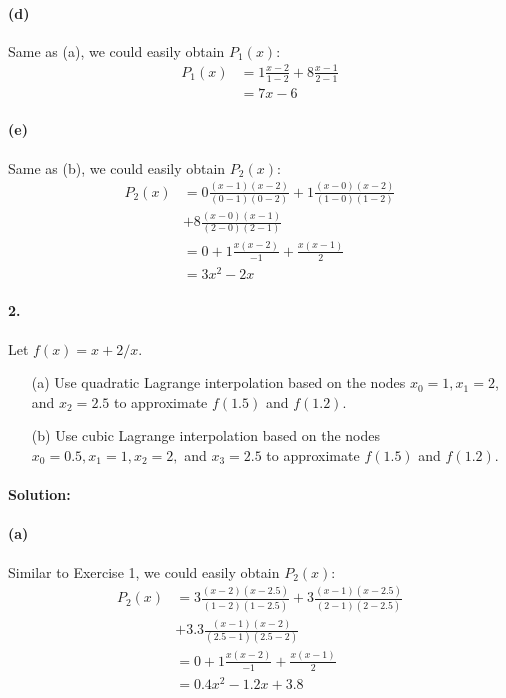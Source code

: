 \documentclass{article}  %
\begin{document}
        \paragraph{(d)}Same as (a), we could easily obtain $P_1(x)$:
        \begin{align*}
          P_1(x) &= 1\frac{x - 2}{1 - 2} + 8\frac{x - 1}{2 - 1}\\
          &= 7x - 6
        \end{align*}
        \paragraph{(e)}Same as (b), we could easily obtain $P_2(x)$:
        \begin{align*}
          P_2(x) &= 0\frac{(x - 1)(x - 2)}{(0 - 1)(0 - 2)} + 1\frac{(x - 0)(x - 2)}{(1 - 0)(1 - 2)}\\
          &+ 8\frac{(x - 0)(x - 1)}{(2 - 0)(2 - 1)}\\
          &= 0 + 1\frac{x(x-2)}{-1} + \frac{x(x - 1)}{2} \\
          &= 3x^2 - 2x
        \end{align*}
        \paragraph{2.}Let $f(x) = x + 2 / x$.
        \begin{enumerate}
            \item[(a)] 
            Use quadratic Lagrange interpolation based on the nodes $x_0 = 1, x_1 = 2$, and $x_2 = 2.5$ to approximate $f(1.5)$ and $f(1.2)$.
            \item[(b)]
            Use cubic Lagrange interpolation based on the nodes $x_0 = 0.5, x_1 = 1, x_2 = 2, $ and $x_3 = 2.5$ to approximate $f(1.5)$ and $f(1.2)$. 
        \end{enumerate}
        \paragraph{Solution:}
        \paragraph{(a)}Similar to Exercise 1, we could easily obtain $P_2(x)$:
        \begin{align*}
          P_2(x) &= 3\frac{(x - 2)(x - 2.5)}{(1 - 2)(1 - 2.5)} + 3\frac{(x - 1)(x - 2.5)}{(2 - 1)(2 - 2.5)}\\
          &+ 3.3\frac{(x - 1)(x - 2)}{(2.5 - 1)(2.5 - 2)}\\
          &= 0 + 1\frac{x(x-2)}{-1} + \frac{x(x - 1)}{2} \\
          &= 0.4x^2 - 1.2x + 3.8
        \end{align*}
\end{document}

